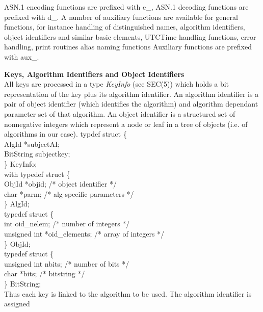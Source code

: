    ASN.1 encoding functions are prefixed with e\_, ASN.1 decoding functions 
   are prefixed with d\_.
   A number of auxiliary functions are available for general functions,
   for instance
   \bi
   \m handling of distinguished names, algorithm identifiers, object
      identifiers and similar basic elements,
   \m UTCTime handling functions,
   \m error handling,
   \m print routines
   \m alias naming functions
   \ei
   Auxiliary functions are prefixed with aux\_.
\ei 

{\bf Keys, Algorithm Identifiers and Object Identifiers}
\\ [1em]
All keys are processed in a type {\em KeyInfo} (see SEC(5)) which holds a 
bit representation of the 
key plus its algorithm identifier. An algorithm identifier
is a pair of object identifier (which identifies the algorithm) and 
algorithm dependant parameter set of that
algorithm. An object identifier is a structured set of nonnegative integers 
which represent a node or leaf
in a tree of objects (i.e. of algorithms in our case).
{\small
\bvtab
\4 typdef struct \{ \\
\6	AlgId     \2 *subjectAI; \\
\6      BitString \2 subjectkey; \\
\4 \} KeyInfo; \\
\evtab
}
with
{\small
\bvtab
\4 typedef struct \{ \\
\6      ObjId  \2  *objid; \3 /* object identifier */ \\
\6      char   \2  *parm;  \3 /* alg-specific parameters */ \\
\4 \} AlgId; \\
\evtab
}
{\small
\bvtab
\4 typedef struct \{ \\
\6      int           \3  oid\_nelem;     \3 /* number of integers */ \\
\6      unsigned int  \3  *oid\_elements; \3 /* array of integers  */ \\
\4 \} ObjId; \\
\evtab
}
{\small
\bvtab
\4 typedef struct \{ \\
\6      unsigned int \3   nbits;  \3 /* number of bits */ \\
\6      char         \3  *bits;   \3 /* bitstring */ \\
\4 \} BitString; \\
\evtab
}
Thus each key is linked to the algorithm to be used. The algorithm 
identifier is assigned

